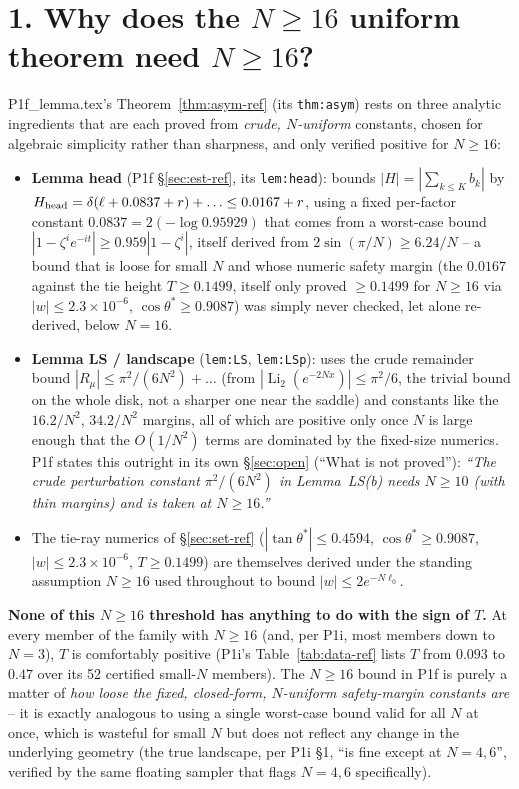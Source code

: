 \documentclass[11pt]{article}
\begin{document}
\section*{1. Why does the $N\ge16$ uniform theorem need $N\ge16$?}
P1f\_lemma.tex's Theorem~\ref{thm:asym-ref} (its \texttt{thm:asym}) rests on three analytic
ingredients that are each proved from \emph{crude, $N$-uniform} constants, chosen for algebraic
simplicity rather than sharpness, and only verified positive for $N\ge16$:
\begin{itemize}
\item \textbf{Lemma head} (P1f \S\ref{sec:est-ref}, its \texttt{lem:head}): bounds $|H|=|\sum_{k\le
K}b_k|$ by $H_{\rm head}=\delta(\ell+0.0837+r)+\ldots\le0.0167+r$, using a fixed per-factor
constant $0.0837=2(-\log0.95929)$ that comes from a worst-case bound $|1-\zeta^ie^{-it}|\ge
0.959|1-\zeta^i|$, itself derived from $2\sin(\pi/N)\ge6.24/N$ -- a bound that is loose for small
$N$ and whose numeric safety margin (the $0.0167$ against the tie height $T\ge0.1499$, itself only
proved $\ge0.1499$ for $N\ge16$ via $|w|\le2.3\times10^{-6}$, $\cos\theta^*\ge0.9087$) was simply
never checked, let alone re-derived, below $N=16$.
\item \textbf{Lemma LS / landscape} (\texttt{lem:LS}, \texttt{lem:LSp}): uses the crude remainder
bound $|R_\mu|\le\pi^2/(6N^2)+\ldots$ (from $|\operatorname{Li}_2(e^{-2Nx})|\le\pi^2/6$, the trivial
bound on the whole disk, not a sharper one near the saddle) and constants like the $16.2/N^2$,
$34.2/N^2$ margins, all of which are positive only once $N$ is large enough that the $O(1/N^2)$
terms are dominated by the fixed-size numerics. P1f states this outright in its own \S\ref{sec:open}
(``What is not proved''): \emph{``The crude perturbation constant $\pi^2/(6N^2)$ in Lemma~LS(b)
needs $N\ge10$ (with thin margins) and is taken at $N\ge16$.''}
\item The tie-ray numerics of \S\ref{sec:set-ref} ($|\tan\theta^*|\le0.4594$, $\cos\theta^*\ge
0.9087$, $|w|\le2.3\times10^{-6}$, $T\ge0.1499$) are themselves derived under the standing
assumption $N\ge16$ used throughout to bound $|w|\le2e^{-N\ell_0}$.
\end{itemize}
\textbf{None of this $N\ge16$ threshold has anything to do with the sign of $T$.} At every member of
the family with $N\ge16$ (and, per P1i, most members down to $N=3$), $T$ is comfortably positive
(P1i's Table~\ref{tab:data-ref} lists $T$ from $0.093$ to $0.47$ over its 52 certified small-$N$
members). The $N\ge16$ bound in P1f is purely a matter of \emph{how loose the fixed, closed-form,
$N$-uniform safety-margin constants are} -- it is exactly analogous to using a single worst-case
bound valid for all $N$ at once, which is wasteful for small $N$ but does not reflect any change in
the underlying geometry (the true landscape, per P1i \S1, ``is fine except at $N=4,6$'', verified by
the same floating sampler that flags $N=4,6$ specifically).
\end{document}
